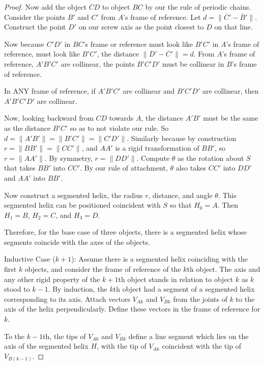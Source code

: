 \documentclass[11pt]{article}
\begin{document}
{\begin{proof}
  Now add the object $CD$ to object $BC$ by our the rule of periodic chains. Consider the points
  $B'$ and $C'$ from $A$'s frame of reference. Let $d = \| \overline C' - \overline B' \|$.
  Construct the point $D'$ on our screw axis as the point closest to $D$ on that line.

  Now because $C'D'$ in $BC$'s frame or reference must look like $B'C'$ in $A$'s frame of reference,
  must look like $B'C'$, the distance $\| \overline D' - \overline C' \| = d$.
  From $A$'s frame of reference, $A'B'C'$ are collinear, the points $B'C'D'$ must be collinear in
  $B$'s frame of reference.

  In ANY frame of reference, if $A'B'C'$ are collinear and $B'C'D'$ are collinear, then $A'B'C'D'$
  are collinear.

  Now, looking backward from $CD$ towards $A$, the distance $A'B'$ must be the same as the
  distance $B'C'$ so as to not violate our rule. So $d = \| A'B' \| = \| B'C' \| = \| C'D'\|$.
  Similarly because by construction $r = \| B B' \| = \| C C' \|$, and $AA'$ is a rigid
  transformation of $BB'$, so $r = \| A A' \|$. By symmetry, $r = \| D D' \|$.
  Compute $\theta$ as the rotation about $S$ that takes $B B'$ into $C C'$. By our rule
  of attachment, $\theta$ also takes $C C'$ into $D D'$ and $A A'$ into $B B'$.

  Now construct a segmented helix, the radius $r$, distance,
  and angle $\theta$. This segmented helix can be positioned coincident with $S$ so
  that $H_0 = A$. Then $H_1=B$, $H_2=C$, and $H_3=D$.

  Therefore, for the base case of three objects, there is a segmented helix whose
  segments coincide with the axes of the objects.
  
  
  Inductive Case ($k+1$):
  Assume there is a segmented helix coinciding with the first $k$ objects, and
  consider the frame of reference of the $k$th object. The axis and any
  other rigid property of the $k+1$th object stands in relation to object $k$
  as $k$ stood to $k-1$. By induction, the $k$th object had a segment
  of a segmented helix corresponding to its axis. Attach vectors $V_{Ak}$ and $V_{Bk}$
  from the
  joints of $k$ to the axis of the helix perpendicularly. Define these
  vectors in the frame of reference for $k$.

  To the $k-1$th, the tips of  $V_{Ak}$ and $V_{Bk}$ define
  a line segment which lies on the axis of the segmented helix $H$, with the
  tip of $V_{Ak}$ coincident with the tip of $V_{B(k-1)}$.


\end{proof}}
\end{document}
